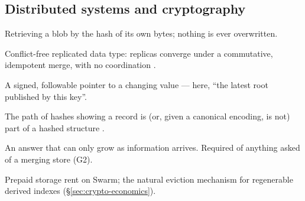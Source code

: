 \subsection*{Distributed systems and cryptography}

\begin{description}[leftmargin=0pt,labelindent=0pt,style=nextline,
                    font=\normalfont\bfseries]
\item[Content addressing] Retrieving a blob by the hash of its own bytes;
  nothing is ever overwritten.
\item[CRDT] Conflict-free replicated data type: replicas converge under a
  commutative, idempotent merge, with no coordination
  \citep{shapiro2011}.
\item[Feed] A signed, followable pointer to a changing value --- here, ``the
  latest root published by this key''.
\item[Merkle proof] The path of hashes showing a record is (or, given a
  canonical encoding, is not) part of a hashed structure
  \citep{merkle1987}.
\item[Monotone] An answer that can only grow as information arrives. Required
  of anything asked of a merging store (G2).
\item[Postage stamp] Prepaid storage rent on Swarm; the natural eviction
  mechanism for regenerable derived indexes (\S\ref{sec:crypto-economics}).
\end{description}
